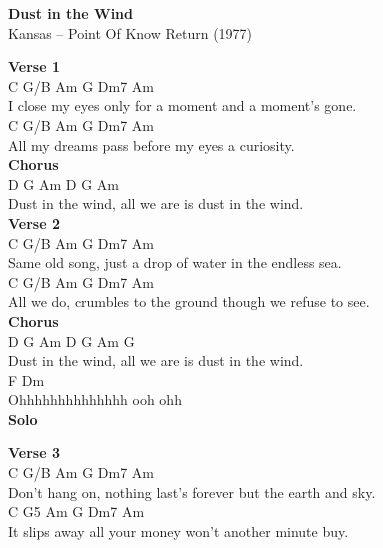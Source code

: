 \documentclass[a4paper]{article}
\begin{document}
    \begin{center}
        \textbf{Dust in the Wind}
        ~\\
        Kansas -- Point Of Know Return (1977)
    \end{center}
    {
        \scriptsize
        \textbf{Verse 1}
        ~\\
        {
            \cutive
            \obeyspaces
  C     G/B  Am    G         Dm7           Am
\\
I close my eyes only for a moment and a moment's gone.
\\
C   G/B   Am     G             Dm7          Am
\\
All my dreams pass before my eyes a curiosity.
\\

        }
        \textbf{Chorus}
        ~\\
        {
            \cutive
            \obeyspaces
D   G        Am    D            G           Am
\\
Dust in the wind, all we are is dust in the wind.
\\

        }
        \textbf{Verse 2}
        ~\\
        {
            \cutive
            \obeyspaces
C  G/B  Am    G             Dm7             Am
\\
Same old song, just a drop of water in the endless sea.
\\
C   G/B  Am   G                 Dm7               Am
\\
All we do, crumbles to the ground though we refuse to see.
\\

        }
        \textbf{Chorus}
        ~\\
        {
            \cutive
            \obeyspaces
D   G        Am    D            G           Am        G
\\
Dust in the wind, all we are is dust in the wind.
\\
F		Dm
\\
Ohhhhhhhhhhhhhh ooh ohh
\\

        }
        \textbf{Solo}
        ~\\
        {
            \cutive
            \obeyspaces

        }
        \textbf{Verse 3}
        ~\\
        {
            \cutive
            \obeyspaces
C      G/B   Am   G                Dm7           Am
\\
Don't hang on, nothing last's forever but the earth and sky.
\\
C  G5      Am  G                  Dm7        Am
\\
It slips away all your money won't another minute buy.
\\

}}
\end{document}
